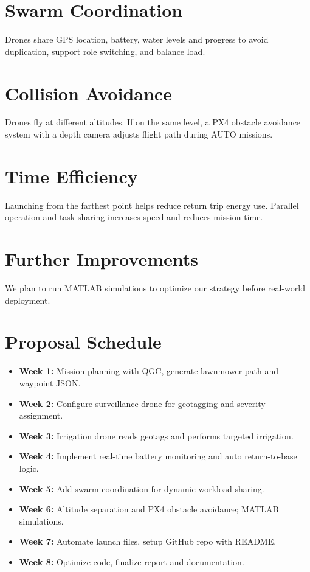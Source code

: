 \documentclass[12pt]{article}
\begin{document}
\section*{Swarm Coordination}
Drones share GPS location, battery, water levels and progress to avoid duplication, support role switching, and balance load.

\section*{Collision Avoidance}
Drones fly at different altitudes. If on the same level, a PX4 obstacle avoidance system with a depth camera adjusts flight path during AUTO missions.

\section*{Time Efficiency}
Launching from the farthest point helps reduce return trip energy use. Parallel operation and task sharing increases speed and reduces mission time.

\section*{Further Improvements}
We plan to run MATLAB simulations to optimize our strategy before real-world deployment.

\section*{Proposal Schedule}

\begin{itemize}
\item \textbf{Week 1:} Mission planning with QGC, generate lawnmower path and waypoint JSON.
\item \textbf{Week 2:} Configure surveillance drone for geotagging and severity assignment.
\item \textbf{Week 3:} Irrigation drone reads geotags and performs targeted irrigation.
\item \textbf{Week 4:} Implement real-time battery monitoring and auto return-to-base logic.
\item \textbf{Week 5:} Add swarm coordination for dynamic workload sharing.
\item \textbf{Week 6:} Altitude separation and PX4 obstacle avoidance; MATLAB simulations.
\item \textbf{Week 7:} Automate launch files, setup GitHub repo with README.
\item \textbf{Week 8:} Optimize code, finalize report and documentation.
\end{itemize}
\end{document}
